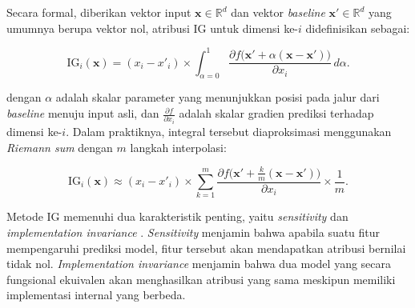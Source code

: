Secara formal, diberikan vektor input $\mathbf{x} \in \mathbb{R}^d$ dan
vektor \textit{baseline} $\mathbf{x'} \in \mathbb{R}^d$ yang umumnya
berupa vektor nol, atribusi IG untuk dimensi ke-$i$ didefinisikan sebagai:

\begin{equation}
    \text{IG}_i(\mathbf{x}) = (x_i - x'_i) \times
    \int_{\alpha=0}^{1}
    \frac{\partial f\big(\mathbf{x'} + \alpha(\mathbf{x} -
    \mathbf{x'})\big)}{\partial x_i} \, d\alpha.
    \label{eq:ig}
\end{equation}

\noindent dengan $\alpha$ adalah skalar parameter yang menunjukkan posisi pada
jalur dari \textit{baseline} menuju input asli, dan
$\frac{\partial f}{\partial x_i}$ adalah skalar gradien prediksi terhadap
dimensi ke-$i$. Dalam praktiknya, integral tersebut diaproksimasi
menggunakan \textit{Riemann sum} dengan $m$ langkah interpolasi:

\begin{equation}
    \text{IG}_i(\mathbf{x}) \approx (x_i - x'_i) \times
    \sum_{k=1}^{m}
    \frac{\partial f\Big(\mathbf{x'} + \frac{k}{m}
    (\mathbf{x} - \mathbf{x'})\Big)}{\partial x_i} \times
    \frac{1}{m}.
    \label{eq:ig_approx}
\end{equation}

Metode IG memenuhi dua karakteristik penting, yaitu \textit{sensitivity}
dan \textit{implementation invariance}
\parencite{sundararajan2017axiomatic}. \textit{Sensitivity} menjamin bahwa
apabila suatu fitur mempengaruhi prediksi model, fitur tersebut akan
mendapatkan atribusi bernilai tidak nol. \textit{Implementation invariance}
menjamin bahwa dua model yang secara fungsional ekuivalen akan menghasilkan
atribusi yang sama meskipun memiliki implementasi internal yang berbeda.